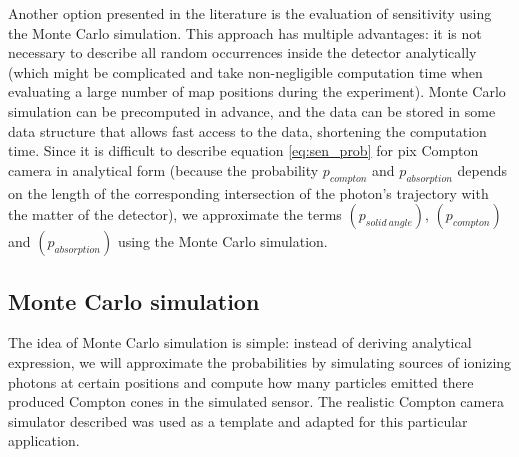 Another option presented in the literature is the evaluation of sensitivity using the Monte Carlo simulation.
This approach has multiple advantages: it is not necessary to describe all random occurrences inside the detector analytically (which might be complicated and take non-negligible computation time when evaluating a large number of map positions during the experiment).
Monte Carlo simulation can be precomputed in advance, and the data can be stored in some data structure that allows fast access to the data, shortening the computation time.
Since it is difficult to describe  equation \ref{eq:sen_prob} for \ac{pix} Compton camera in analytical form 
(because the probability $p_{compton}$ and $p_{absorption}$ depends on the length of the corresponding intersection of the photon's trajectory with the matter of the detector),
we approximate the terms $(p_{solid\ angle})$, $(p_{compton})$ and $(p_{absorption})$ using the Monte Carlo simulation.%



\subsection{Monte Carlo simulation}%
The idea of Monte Carlo simulation is simple:
instead of deriving analytical expression,
we will approximate the probabilities by simulating sources of ionizing photons at certain positions and compute how many particles emitted there produced Compton cones in the simulated sensor.
The realistic Compton camera simulator described \cite{baca2019timepix} was used as a template and adapted for this particular application.

